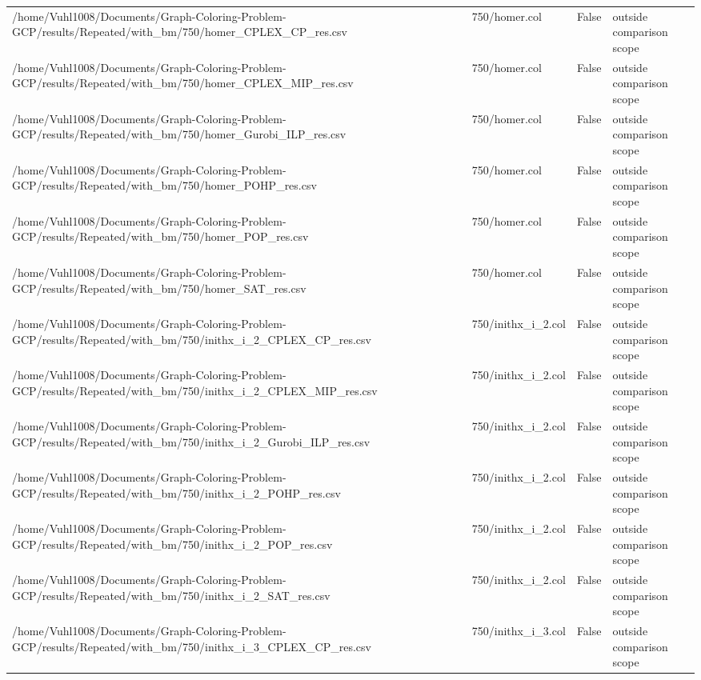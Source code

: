 \begin{table}[htbp]
\begin{tabular}{llll}
/home/Vuhl1008/Documents/Graph-Coloring-Problem-GCP/results/Repeated/with\_bm/750/homer\_CPLEX\_CP\_res.csv & 750/homer.col & False & outside comparison scope \\
/home/Vuhl1008/Documents/Graph-Coloring-Problem-GCP/results/Repeated/with\_bm/750/homer\_CPLEX\_MIP\_res.csv & 750/homer.col & False & outside comparison scope \\
/home/Vuhl1008/Documents/Graph-Coloring-Problem-GCP/results/Repeated/with\_bm/750/homer\_Gurobi\_ILP\_res.csv & 750/homer.col & False & outside comparison scope \\
/home/Vuhl1008/Documents/Graph-Coloring-Problem-GCP/results/Repeated/with\_bm/750/homer\_POHP\_res.csv & 750/homer.col & False & outside comparison scope \\
/home/Vuhl1008/Documents/Graph-Coloring-Problem-GCP/results/Repeated/with\_bm/750/homer\_POP\_res.csv & 750/homer.col & False & outside comparison scope \\
/home/Vuhl1008/Documents/Graph-Coloring-Problem-GCP/results/Repeated/with\_bm/750/homer\_SAT\_res.csv & 750/homer.col & False & outside comparison scope \\
/home/Vuhl1008/Documents/Graph-Coloring-Problem-GCP/results/Repeated/with\_bm/750/inithx\_i\_2\_CPLEX\_CP\_res.csv & 750/inithx\_i\_2.col & False & outside comparison scope \\
/home/Vuhl1008/Documents/Graph-Coloring-Problem-GCP/results/Repeated/with\_bm/750/inithx\_i\_2\_CPLEX\_MIP\_res.csv & 750/inithx\_i\_2.col & False & outside comparison scope \\
/home/Vuhl1008/Documents/Graph-Coloring-Problem-GCP/results/Repeated/with\_bm/750/inithx\_i\_2\_Gurobi\_ILP\_res.csv & 750/inithx\_i\_2.col & False & outside comparison scope \\
/home/Vuhl1008/Documents/Graph-Coloring-Problem-GCP/results/Repeated/with\_bm/750/inithx\_i\_2\_POHP\_res.csv & 750/inithx\_i\_2.col & False & outside comparison scope \\
/home/Vuhl1008/Documents/Graph-Coloring-Problem-GCP/results/Repeated/with\_bm/750/inithx\_i\_2\_POP\_res.csv & 750/inithx\_i\_2.col & False & outside comparison scope \\
/home/Vuhl1008/Documents/Graph-Coloring-Problem-GCP/results/Repeated/with\_bm/750/inithx\_i\_2\_SAT\_res.csv & 750/inithx\_i\_2.col & False & outside comparison scope \\
/home/Vuhl1008/Documents/Graph-Coloring-Problem-GCP/results/Repeated/with\_bm/750/inithx\_i\_3\_CPLEX\_CP\_res.csv & 750/inithx\_i\_3.col & False & outside comparison scope \\

\end{tabular}
\end{table}
